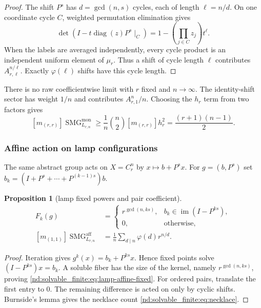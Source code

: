 \documentclass[10pt]{article}
\newcommand{\SMG}{\operatorname{SMG}}
\newcommand{\MGF}{\SMG}
\newcommand{\im}{\operatorname{im}}
\newtheorem{proposition}{Proposition}
\begin{document}
\begin{proof}
The shift $P^s$ has $d=\gcd(n,s)$ cycles, each of length
$\ell=n/d$.  On one coordinate cycle $C$, weighted permutation elimination
gives
\[
 \det(I-t\operatorname{diag}(z)P^s\mid_C)
 =1-\left(\prod_{j\in C}z_j\right)t^\ell.
\]
When the labels are averaged independently, every cycle product is an
independent uniform element of $\mu_r$.  Thus a shift of cycle length $\ell$
contributes $A_{r,\ell}^{n/\ell}$.  Exactly $\varphi(\ell)$ shifts have this
cycle length.
\end{proof}

There is no raw coefficientwise limit with $r$ fixed and $n\to\infty$.  The
identity-shift sector has weight $1/n$ and contributes $A_{r,1}^n/n$.
Choosing the $h_r$ term from two factors gives
\[
 [m_{(r,r)}]\MGF^{\mathrm{mon}}_{L_{r,n}}
 \geq \frac1n\binom n2[m_{(r,r)}]h_r^2
 =\frac{(r+1)(n-1)}2.
\]

\subsubsection{Affine action on lamp configurations}

The same abstract group acts on $X=C_r^n$ by $x\mapsto b+P^sx$.  For
$g=(b,P^s)$ set $b_k=(I+P^s+\cdots+P^{(k-1)s})b$.

\begin{proposition}[lamp fixed powers and pair coefficient]
\begin{align}
 F_k(g)&=\begin{cases}
 r^{\gcd(n,ks)},&b_k\in\im(I-P^{ks}),\\
 0,&\text{otherwise},
 \end{cases}\label{nd:solvable_finite:eq:lamp-affine-fixed}\\
 [m_{(1,1)}]\MGF^{\mathrm{aff}}_{L_{r,n}}
 &=\boxed{\frac1n\sum_{d\mid n}\varphi(d)r^{n/d}}.\label{nd:solvable_finite:eq:necklace}
\end{align}
\end{proposition}

\begin{proof}
Iteration gives $g^k(x)=b_k+P^{ks}x$.  Hence fixed points solve
$(I-P^{ks})x=b_k$.  A soluble fiber has the size of the kernel, namely
$r^{\gcd(n,ks)}$, proving \eqref{nd:solvable_finite:eq:lamp-affine-fixed}.  For ordered pairs,
translate the first entry to $0$.  The remaining difference is acted on only
by cyclic shifts.  Burnside's lemma gives the necklace count
\eqref{nd:solvable_finite:eq:necklace}.
\end{proof}
\end{document}
